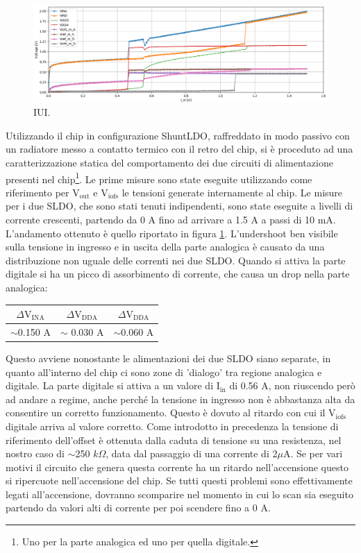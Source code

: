 \begin{figure}
\centering
\includegraphics[scale=.3]{Immagini/IUI2}
\caption{IUI.}
\label{IUI}
\end{figure}
Utilizzando il chip in configurazione ShuntLDO, raffreddato in modo passivo con un radiatore messo a contatto termico con il retro del chip, si è proceduto ad una caratterizzazione statica del comportamento dei due circuiti di alimentazione presenti nel chip\footnote{Uno per la parte analogica ed uno per quella digitale.}. 
Le prime misure sono state eseguite utilizzando come riferimento per $\mathrm{V_{out}}$ e $\mathrm{V_{iofs}}$ le tensioni generate internamente al chip. Le misure per i due SLDO, che sono stati tenuti indipendenti, sono state eseguite a livelli di corrente crescenti, partendo da 0 A fino ad arrivare a 1.5 A a passi di 10 mA. 
L'andamento ottenuto è quello riportato in figura \ref{IUI}. L'undershoot ben visibile sulla tensione in ingresso e in uscita della parte analogica è causato da una distribuzione non uguale delle correnti nei due SLDO. 
Quando si attiva la parte digitale si ha un picco di assorbimento di corrente, che causa un drop nella parte analogica:
\begin{center}
\begin{tabular}{ccc }
\hline
$\Delta \mathrm{V_{INA}}$ & $\Delta \mathrm{V_{DDA}}$ &$\Delta \mathrm{V_{DDA}}$  \\ \hline
$\sim$0.150 A & $\sim$ 0.030 A& $\sim$0.060 A\\ \hline     
\end{tabular}
\end{center}

Questo avviene nonostante le alimentazioni dei due SLDO siano separate, in quanto all'interno del chip ci sono zone di 'dialogo' tra regione analogica e digitale. 
La parte digitale si attiva a un valore di $\mathrm{I_{in}}$ di 0.56 A, non riuscendo però ad andare a regime, anche perché la tensione in ingresso non è abbastanza alta da consentire un corretto funzionamento.
Questo è dovuto al ritardo con cui il $\mathrm{V_{iofs}}$ digitale arriva al valore corretto. Come introdotto in precedenza la tensione di riferimento dell'offset è ottenuta dalla caduta di tensione su una resistenza, nel nostro caso di $\sim$250 $k\Omega$, data dal passaggio di una corrente di 2$\mu$A. Se per vari motivi il circuito che genera questa corrente ha un ritardo nell'accensione questo si ripercuote nell'accensione del chip.  
Se tutti questi problemi sono effettivamente legati all'accensione, dovranno scomparire nel momento in cui lo scan sia eseguito partendo da valori alti di corrente per poi scendere fino a 0 A.

